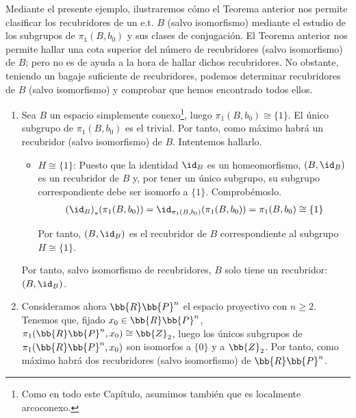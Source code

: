 \begin{ejemplo} Mediante el presente ejemplo, ilustraremos cómo el Teorema anterior nos permite clasificar los recubridores de un e.t. $B$ (salvo isomorfismo) mediante el estudio de los subgrupos de $\pi_1(B,b_0)$ y sus clases de conjugación. El Teorema anterior nos permite hallar una cota superior del número de recubridores (salvo isomorfismo) de $B$; pero no es de ayuda a la hora de hallar dichos recubridores. No obstante, teniendo un bagaje suficiente de recubridores, podemos determinar recubridores de $B$ (salvo isomorfismo) y comprobar que hemos encontrado todos ellos.
    \begin{enumerate}
        \item Sea $B$ un espacio simplemente conexo\footnote{Como en todo este Capítulo, asumimos también que es localmente arcoconexo.}, luego $\pi_1(B,b_0) \cong \{1\}$. El único subgrupo de $\pi_1(B,b_0)$ es el trivial.
        Por tanto, como máximo habrá un recubridor (salvo isomorfismo) de $B$. Intentemos hallarlo.
        \begin{itemize}
            \item \ul{$H\cong \{1\}$}: Puesto que la identidad $\id_B$ es un homeomorfismo, $(B, \id_B)$ es un recubridor de $B$ y, por tener un único subgrupo, su subgrupo correspondiente debe ser isomorfo a $\{1\}$. Comprobémoslo.
            \begin{gather*}
                {(\id_{B})}_\ast(\pi_1(B,b_0))
                = \id_{\pi_1(B,b_0)}(\pi_1(B,b_0))
                = \pi_1(B,b_0) \cong \{1\}
            \end{gather*}

            Por tanto, $(B, \id_B)$ es el recubridor de $B$ correspondiente al subgrupo $H\cong \{1\}$.
        \end{itemize}

        Por tanto, salvo isomorfismo de recubridores, $B$ solo tiene un recubridor: $(B, \id_B)$.
        
        \item Consideramos ahora $\bb{R}\bb{P}^n$ el espacio proyectivo con $n\geq 2$.
        Tenemos que, fijado $x_0\in \bb{R}\bb{P}^n$, $\pi_1(\bb{R}\bb{P}^n, x_0) \cong \bb{Z}_2$, luego los únicos subgrupos de $\pi_1(\bb{R}\bb{P}^n, x_0)$ son isomorfos a $\{0\}$ y a $\bb{Z}_2$. Por tanto, como máximo habrá dos recubridores (salvo isomorfismo) de $\bb{R}\bb{P}^n$.


\end{enumerate}
\end{ejemplo}
